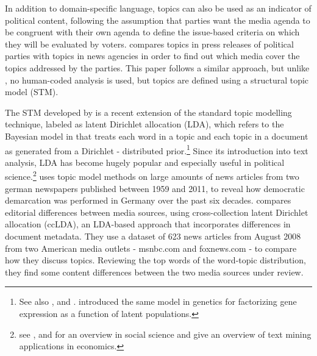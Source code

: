 \documentclass[12pt,a4paper,notitlepage]{article}
\begin{document}
In addition to domain-specific language, topics can also be used as an indicator of political content, following the assumption that parties want the media agenda to be congruent with their own agenda to define the issue-based criteria on which they will be evaluated by voters. \citet{eberl_one_2017} compares topics in press releases of political parties with topics in news agencies in order to find out which media cover the topics addressed by the parties. This paper follows a similar approach, but unlike \citet{eberl_one_2017}, no human-coded analysis is used, but topics are defined using a structural topic model (STM).  

The STM developed by \citet{roberts_model_2016} is a recent extension of the standard topic modelling technique, labeled as latent Dirichlet allocation (LDA), which refers to the Bayesian model in \citet{blei_latent_2003} that treats each word in a topic and each topic in a document as generated from a Dirichlet - distributed prior.\footnote{See also \citet{griffiths_probabilistic_2002}, \citet{griffiths_finding_2004} and \citet{hofmann_probabilistic_1999}. \citet{pritchard_inference_2000} introduced the same model in genetics for factorizing gene expression as a function of latent populations.} Since its introduction into text analysis, LDA has become hugely popular and especially useful in political science.\footnote{see \citet{blei_probabilistic_2012}, \citet{grimmer_text_2013} and \citet{wiedmann_text_2016} for an overview in social science and \citet{gentzkow_text_2017} give an overview of text mining applications in economics.} \citet{wiedmann_text_2016} uses topic model methods on large amounts of news articles from two german newspapers published between 1959 and 2011, to reveal how democratic demarcation was performed in Germany over the past six decades. \citet{paul_cross-collection_2009} compares editorial differences between media sources, using cross-collection latent Dirichlet allocation (ccLDA), an LDA-based approach that incorporates differences in document metadata. They use a dataset of 623 news articles from August 2008 from two American media outlets - msnbc.com and foxnews.com - to compare how they discuss topics. Reviewing the top words of the word-topic distribution, they find some content differences between the two media sources under review.
\end{document}
